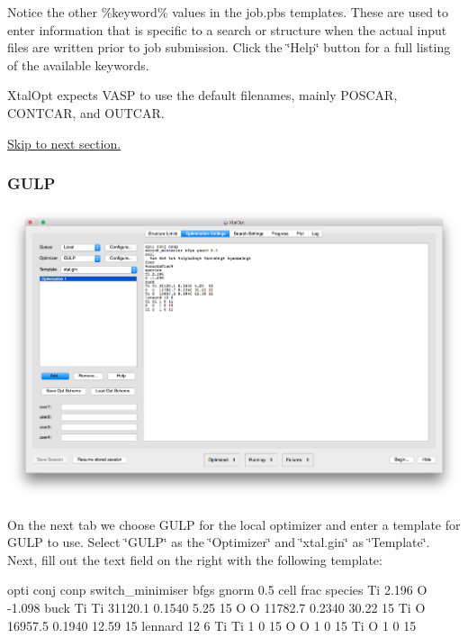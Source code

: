 Notice the other \%keyword\% values in the job.\+pbs templates. These are used to enter information that is specific to a search or structure when the actual input files are written prior to job submission. Click the \char`\"{}\+Help\char`\"{} button for a full listing of the available keywords.

Xtal\+Opt expects V\+A\+S\+P to use the default filenames, mainly P\+O\+S\+C\+A\+R, C\+O\+N\+T\+C\+A\+R, and O\+U\+T\+C\+A\+R.

\hyperlink{tut-xo_qisetup}{Skip to next section.}\hypertarget{tut-xo_gulp-opt}{}\subsubsection{G\+U\+L\+P}\label{tut-xo_gulp-opt}
 
\begin{DoxyImageNoCaption}
  \mbox{\includegraphics[width=\textwidth]{opt-set-gulp.png}}
\end{DoxyImageNoCaption}


On the next tab we choose G\+U\+L\+P for the local optimizer and enter a template for G\+U\+L\+P to use. Select \char`\"{}\+G\+U\+L\+P\char`\"{} as the \char`\"{}\+Optimizer\char`\"{} and \char`\"{}xtal.\+gin\char`\"{} as \char`\"{}\+Template\char`\"{}. Next, fill out the text field on the right with the following template\+: 
\begin{DoxyCode}
opti conj conp
switch\_minimiser bfgs gnorm 0.5
cell
frac
species
Ti 2.196
O -1.098
buck
Ti Ti 31120.1 0.1540 5.25  15
O  O  11782.7 0.2340 30.22 15
Ti O  16957.5 0.1940 12.59 15
lennard 12 6
Ti Ti 1 0 15
O  O  1 0 15
Ti O  1 0 15
\end{DoxyCode}


